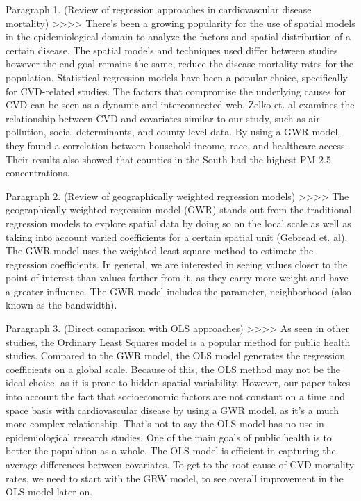 \documentclass[
]{article}
\begin{document}
Paragraph 1. (Review of regression approaches in cardiovascular disease
mortality) \textgreater\textgreater\textgreater\textgreater{} There's
been a growing popularity for the use of spatial models in the
epidemiological domain to analyze the factors and spatial distribution
of a certain disease. The spatial models and techniques used differ
between studies however the end goal remains the same, reduce the
disease mortality rates for the population. Statistical regression
models have been a popular choice, specifically for CVD-related studies.
The factors that compromise the underlying causes for CVD can be seen as
a dynamic and interconnected web. Zelko et. al examines the relationship
between CVD and covariates similar to our study, such as air pollution,
social determinants, and county-level data. By using a GWR model, they
found a correlation between household income, race, and healthcare
access. Their results also showed that counties in the South had the
highest PM 2.5 concentrations.

Paragraph 2. (Review of geographically weighted regression models)
\textgreater\textgreater\textgreater\textgreater{} The geographically
weighted regression model (GWR) stands out from the traditional
regression models to explore spatial data by doing so on the local scale
as well as taking into account varied coefficients for a certain spatial
unit (Gebread et. al). The GWR model uses the weighted least square
method to estimate the regression coefficients. In general, we are
interested in seeing values closer to the point of interest than values
farther from it, as they carry more weight and have a greater influence.
The GWR model includes the parameter, neighborhood (also known as the
bandwidth).

Paragraph 3. (Direct comparison with OLS approaches)
\textgreater\textgreater\textgreater\textgreater{} As seen in other
studies, the Ordinary Least Squares model is a popular method for public
health studies. Compared to the GWR model, the OLS model generates the
regression coefficients on a global scale. Because of this, the OLS
method may not be the ideal choice. as it is prone to hidden spatial
variability. However, our paper takes into account the fact that
socioeconomic factors are not constant on a time and space basis with
cardiovascular disease by using a GWR model, as it's a much more complex
relationship. That's not to say the OLS model has no use in
epidemiological research studies. One of the main goals of public health
is to better the population as a whole. The OLS model is efficient in
capturing the average differences between covariates. To get to the root
cause of CVD mortality rates, we need to start with the GRW model, to
see overall improvement in the OLS model later on.
\end{document}
